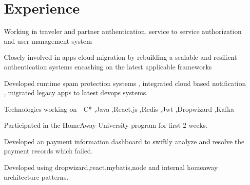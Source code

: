 \documentclass[]{deedy-resume-openfont}
\begin{document}
\begin{minipage}[t]{0.33\textwidth}
%
%

\end{minipage}
\hfill
\begin{minipage}[t]{0.66\textwidth}




\section{Experience}
\vspace{\topsep} %
\begin{tightemize}
\item Working in traveler and partner authentication, service to service authorization and user management system
\item Closely involved in apps cloud migration by rebuilding a scalable and resilient authentication systems encashing on the latest applicable frameworks
\item Developed runtime spam protection systems , integrated cloud based notification , migrated legacy apps to latest devops systems.
\item Technologies working on - C* ,Java ,React.js ,Redis ,Jwt ,Dropwizard ,Kafka
\end{tightemize}
\sectionsep

\begin{tightemize}
\item Participated in the HomeAway University program for first 2 weeks.
\item Developed an payment information dashboard to swiftly analyze and resolve the payment records which failed.
\item Developed using dropwizard,react,mybatis,node and internal homeaway architecture patterns.
\end{tightemize}
\sectionsep


\end{minipage}
\end{document}
